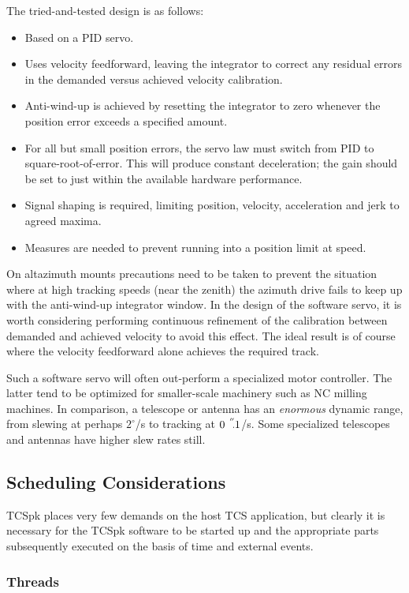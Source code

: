 \documentclass[12pt,fleqn,twoside]{article}
\renewcommand{\_}{{\tt\char'137}}     %
\newcommand{\arcsec}[2] {\arcseci{#1}$\hspace{-0.4em}.#2$}
\newcommand{\arcseci}[1] {$#1\hspace{0.05em}$\raisebox{-0.5ex}
                         {$^{'\hspace{-0.1em}'}$}}
\begin{document}
The tried-and-tested design is as follows:
\begin{itemize}
\item Based on a PID servo.
\item Uses velocity feedforward, leaving the integrator
      to correct any residual errors in the demanded versus
      achieved velocity calibration.
\item Anti-wind-up is achieved by resetting the integrator to zero
      whenever the position error exceeds a specified amount.
\item For all but small position errors, the
      servo law must switch from PID to square-root-of-error.
      This will produce constant deceleration;  the gain
      should be set to just within the available
      hardware performance.
\item Signal shaping is required, limiting position, velocity,
      acceleration and jerk to agreed maxima.
\item Measures are needed to prevent running into a position limit
      at speed.
\end{itemize}
On altazimuth mounts precautions need to be taken
to prevent the situation where at high tracking speeds (near the
zenith) the azimuth drive fails to keep up with the
anti-wind-up integrator window.  In the design of the software
servo, it is worth considering performing continuous refinement of the
calibration between demanded and achieved velocity to avoid this
effect.  The ideal result is of course where the velocity feedforward
alone achieves the required track.

Such a software servo will
often out-perform a specialized motor controller.  The
latter tend to be optimized for smaller-scale machinery such as
NC milling machines.  In comparison, a telescope or antenna has an
{\it enormous}\/ dynamic range, from slewing at perhaps $2^\circ\!$/s
to tracking at \arcsec{0}{1}/s.  Some specialized telescopes and
antennas have higher slew rates still.

\subsection{Scheduling Considerations}

TCSpk places very few demands on the host TCS application, but
clearly it is necessary for the TCSpk software to be started up
and the appropriate parts subsequently executed on the basis of
time and external events.

\subsubsection{Threads}
\label{threads}
\end{document}
